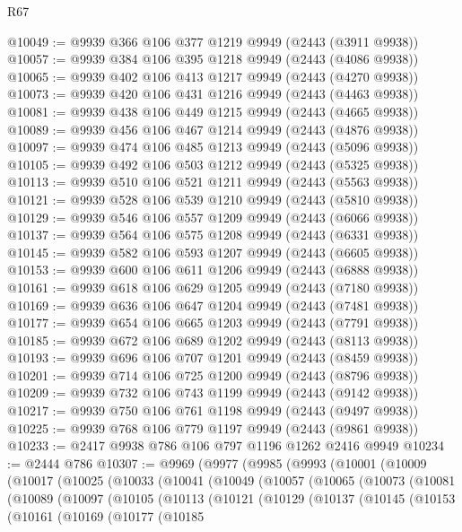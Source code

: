 \begin{lexlean}{R67}
\begin{coremodule}
@10049 := @9939 @366 @106 @377 @1219 @9949 (@2443 (@3911 @9938))
@10057 := @9939 @384 @106 @395 @1218 @9949 (@2443 (@4086 @9938))
@10065 := @9939 @402 @106 @413 @1217 @9949 (@2443 (@4270 @9938))
@10073 := @9939 @420 @106 @431 @1216 @9949 (@2443 (@4463 @9938))
@10081 := @9939 @438 @106 @449 @1215 @9949 (@2443 (@4665 @9938))
@10089 := @9939 @456 @106 @467 @1214 @9949 (@2443 (@4876 @9938))
@10097 := @9939 @474 @106 @485 @1213 @9949 (@2443 (@5096 @9938))
@10105 := @9939 @492 @106 @503 @1212 @9949 (@2443 (@5325 @9938))
@10113 := @9939 @510 @106 @521 @1211 @9949 (@2443 (@5563 @9938))
@10121 := @9939 @528 @106 @539 @1210 @9949 (@2443 (@5810 @9938))
@10129 := @9939 @546 @106 @557 @1209 @9949 (@2443 (@6066 @9938))
@10137 := @9939 @564 @106 @575 @1208 @9949 (@2443 (@6331 @9938))
@10145 := @9939 @582 @106 @593 @1207 @9949 (@2443 (@6605 @9938))
@10153 := @9939 @600 @106 @611 @1206 @9949 (@2443 (@6888 @9938))
@10161 := @9939 @618 @106 @629 @1205 @9949 (@2443 (@7180 @9938))
@10169 := @9939 @636 @106 @647 @1204 @9949 (@2443 (@7481 @9938))
@10177 := @9939 @654 @106 @665 @1203 @9949 (@2443 (@7791 @9938))
@10185 := @9939 @672 @106 @689 @1202 @9949 (@2443 (@8113 @9938))
@10193 := @9939 @696 @106 @707 @1201 @9949 (@2443 (@8459 @9938))
@10201 := @9939 @714 @106 @725 @1200 @9949 (@2443 (@8796 @9938))
@10209 := @9939 @732 @106 @743 @1199 @9949 (@2443 (@9142 @9938))
@10217 := @9939 @750 @106 @761 @1198 @9949 (@2443 (@9497 @9938))
@10225 := @9939 @768 @106 @779 @1197 @9949 (@2443 (@9861 @9938))
@10233 := @2417 @9938 @786 @106 @797 @1196 @1262 @2416 @9949
@10234 := @2444 @786
@10307 := @9969
    (@9977
      (@9985
        (@9993
          (@10001
            (@10009
              (@10017
                (@10025
                  (@10033
                    (@10041
                      (@10049
                        (@10057
                          (@10065
                            (@10073
                              (@10081
                                (@10089
                                  (@10097
                                    (@10105
                                      (@10113
                                        (@10121
                                          (@10129
                                            (@10137
                                              (@10145
                                                (@10153
                                                  (@10161
                                                    (@10169
                                                      (@10177
                                                        (@10185

\end{coremodule}
\end{lexlean}
